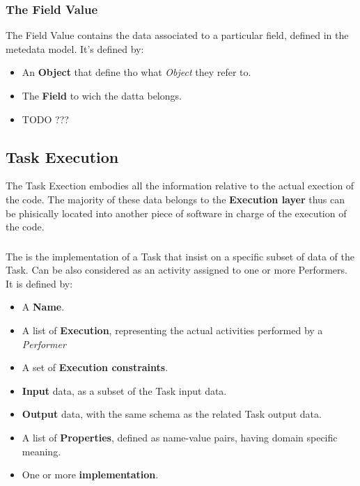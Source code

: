 \subsubsection{The Field Value}
The Field Value contains the data associated to a particular field, defined in
the metedata model. It's defined by:
\begin{itemize}
    \item An \textbf{Object} that define tho what \emph{Object} they refer to.
    \item The \textbf{Field} to wich the datta belongs.
    \item TODO ???
\end{itemize}







\subsection{Task Execution}
The Task Exection embodies all the information relative to the actual exection
of the code. The majority of these data belongs to the \textbf{Execution layer}
thus can be phisically located into another piece of software in charge of the
execution of the code.


\subsubsection{\utask{}}
The \utask{} is the implementation of a Task that insist on a specific subset
of data of the Task. Can be also considered as an activity assigned to one or
more Performers. It is defined by:
\begin{itemize}
    \item A \textbf{Name}.
    
    \item A list of \textbf{Execution}, representing the actual activities
    performed by a \emph{Performer}
    
    \item A set of \textbf{Execution constraints}.
    
    \item \textbf{Input} data, as a subset of the Task input data.
    
    \item \textbf{Output} data, with the same schema as the related Task output
    data.
    
    \item A list of \textbf{Properties}, defined as name-value pairs, having
    domain specific meaning. 
    
    \item One or more \textbf{\utask{} implementation}.
\end{itemize}








